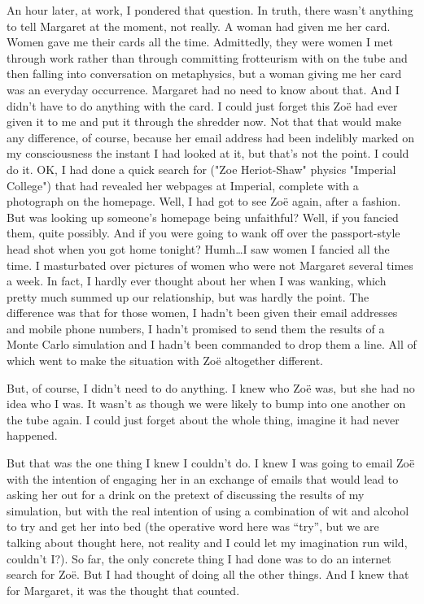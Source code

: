An hour later, at work, I pondered that question. In truth, there
wasn't anything to tell Margaret at the moment, not really. A woman
had given me her card. Women gave me their cards all the time.
Admittedly, they were women I met through work rather than through
committing frotteurism with on the tube and then falling into
conversation on metaphysics, but a woman giving me her card was an
everyday occurrence. Margaret had no need to know about that. And I
didn't have to do anything with the card. I could just forget this
Zoë had ever given it to me and put it through the shredder now.
Not that that would make any difference, of course, because her
email address had been indelibly marked on my consciousness the
instant I had looked at it, but that's not the point. I could do it.
OK, I had done a quick search for ({\twelvett "Zoe Heriot-Shaw" physics
"Imperial College"}) that had revealed her webpages at Imperial,
complete with a photograph on the homepage. Well, I had got to see
Zoë again, after a fashion. But was looking up someone's
homepage being unfaithful? Well, if you fancied them, quite
possibly. And if you were going to wank off over the passport-style
head shot when you got home tonight? Humh\dots I saw women I fancied
all the time. I masturbated over pictures of women who were not
Margaret several times a week. In fact, I hardly ever thought about
her when I was wanking, which pretty much summed up our
relationship, but was hardly the point. The difference was that for
those women, I hadn't been given their email addresses and mobile
phone numbers, I hadn't promised to send them the results of a Monte
Carlo simulation and I hadn't been commanded to drop them a line.
All of which went to make the situation with Zoë altogether
different.

But, of course, I didn't {\twelveit need\/} to do anything. I knew
who Zoë was, but she had no idea who I was. It wasn't as though
we were likely to bump into one another on the tube again. I could
just forget about the whole thing, imagine it had never happened.

But that was the one thing I knew I couldn't do. I knew I was going
to email Zoë with the intention of engaging her in an exchange
of emails that would lead to asking her out for a drink on the
pretext of discussing the results of my simulation, but with the
real intention of using a combination of wit and alcohol to try and
get her into bed (the operative word here was ``try'', but we are
talking about thought here, not reality and I could let my
imagination run wild, couldn't I?). So far, the only concrete thing
I had done was to do an internet search for Zoë. But I had {\twelveit thought\/} of
doing all the other things. And I knew that for Margaret, it was the
thought that counted.

